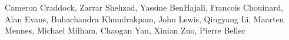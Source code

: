 Cameron Craddock, Zarrar Shehzad, Yassine BenHajali, Francois Chouinard, Alan Evans, Buhachandra Khundrakpam, John Lewis, Qingyang Li, Maarten Mennes, Michael Milham, Chaogan Yan, Xinian Zuo, Pierre Bellec

